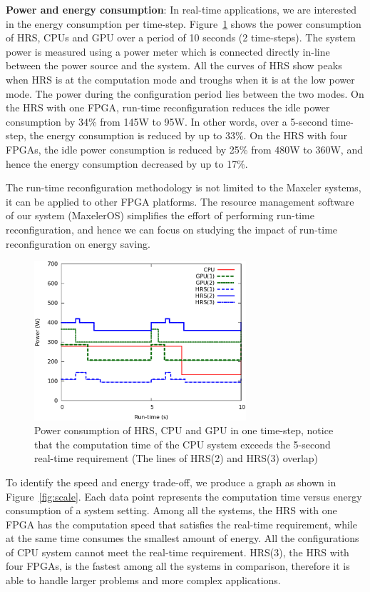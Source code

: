 \textbf{Power and energy consumption}: In real-time applications, we are interested in the energy consumption per time-step.
Figure~\ref{fig:power} shows the power consumption of HRS, CPUs and GPU over a period of 10 seconds (2 time-steps).
The system power is measured using a power meter which is connected directly in-line between the power source and the system.
All the curves of HRS show peaks when HRS is at the computation mode and troughs when it is at the low power mode.
The power during the configuration period lies between the two modes.
On the HRS with one FPGA, run-time reconfiguration reduces the idle power consumption by 34\% from 145W to 95W.
In other words, over a 5-second time-step, the energy consumption is reduced by up to 33\%.
On the HRS with four FPGAs, the idle power consumption is reduced by 25\% from 480W to 360W, and hence the energy consumption decreased by up to 17\%.

The run-time reconfiguration methodology is not limited to the Maxeler systems, it can be applied to other FPGA platforms.
The resource management software of our system (MaxelerOS) simplifies the effort of performing run-time reconfiguration, and hence we can focus on studying the impact of run-time reconfiguration on energy saving.

\begin{figure}[t!]
\centering
\includegraphics[width=0.7\textwidth]{runtime_reconfiguration/figures/fig_power2}
\caption{Power consumption of HRS, CPU and GPU in one time-step, notice that the computation time of the CPU system exceeds the 5-second real-time requirement (The lines of HRS(2) and HRS(3) overlap)}
\label{fig:power}
\end{figure}

To identify the speed and energy trade-off, we produce a graph as shown in Figure~\ref{fig:scale}. 
Each data point represents the computation time versus energy consumption of a system setting.
Among all the systems, the HRS with one FPGA has the computation speed that satisfies the real-time requirement, while at the same time consumes the smallest amount of energy.
All the configurations of CPU system cannot meet the real-time requirement.
HRS(3), the HRS with four FPGAs, is the fastest among all the systems in comparison, therefore it is able to handle larger problems and more complex applications.

